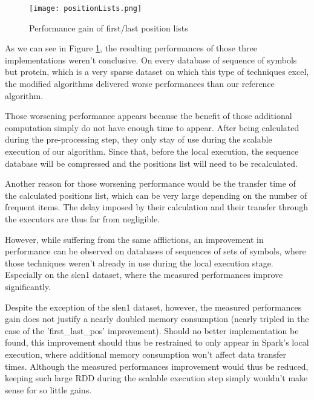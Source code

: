 \documentclass{eplmastersthesis}
\begin{document}
\begin{figure}[h]
  \centering
  \texttt{[image: positionLists.png]}
  \caption{Performance gain of first/last position lists}
  \label{fig:positionListPerf}
\end{figure}

As we can see in Figure \ref{fig:positionListPerf}, the resulting performances of those three implementations weren't conclusive. On every database of sequence of symbols but protein, which is a very sparse dataset on which this type of techniques excel, the modified algorithms delivered worse performances than our reference algorithm. \newline

Those worsening performance appears because the benefit of those additional computation simply do not have enough time to appear. After being calculated during the pre-processing step, they only stay of use during the scalable execution of our algorithm. Since that, before the local execution, the sequence database will be compressed and the positions list will need to be recalculated. \newline

Another reason for those worsening performance would be the transfer time of the calculated positions list, which can be very large depending on the number of frequent items. The delay imposed by their calculation and their transfer through the executors are thus far from negligible. \newline

However, while suffering from the same afflictions, an improvement in performance can be observed on databases of sequences of sets of symbols, where those techniques weren't already in use during the local execution stage. Especially on the slen1 dataset, where the measured performances improve significantly. \newline

Despite the exception of the slen1 dataset, however, the measured performances gain does not justify a nearly doubled memory consumption (nearly tripled in the case of the 'first\_last\_pos' improvement). Should no better implementation be found, this improvement should thus be restrained to only appear in Spark's local execution, where additional memory consumption won't affect data transfer times. Although the measured performances improvement would thus be reduced, keeping such large RDD during the scalable execution step simply wouldn't make sense for so little gains.
\end{document}
